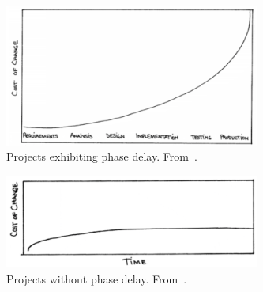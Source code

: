 \documentclass{sig-alternate}
\newcommand{\fig}[1]{Figure~\ref{fig:#1}}
\begin{document}
\begin{figure}
 \includegraphics[width=3.3in]{img/beckB4.png}
 \caption{Projects exhibiting phase delay. From~\cite{beck00}.}\label{fig:curve1}
 \end{figure}
\begin{figure}
 \includegraphics[width=3.3in]{img/beckAFTER.png}
 \caption{Projects without   phase delay. From~\cite{beck00}.}\label{fig:curve2}
\end{figure}

\end{document}
